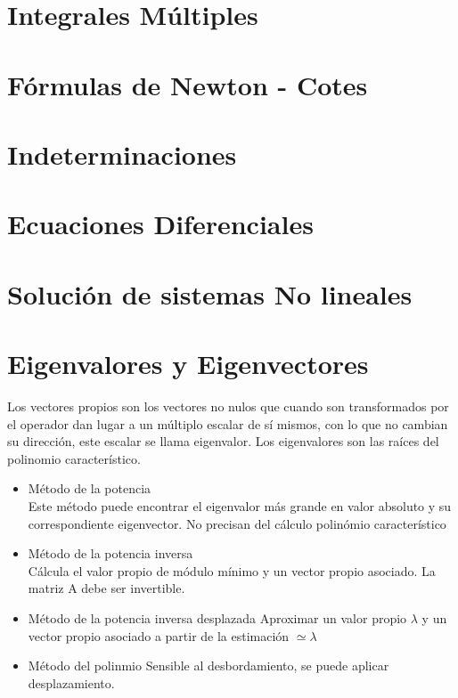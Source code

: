 \section{Integrales M\'ultiples}

\section{F\'ormulas de Newton - Cotes}

\section{Indeterminaciones}

\section{Ecuaciones Diferenciales}

\section{Soluci\'on de sistemas No lineales}

\section{Eigenvalores y Eigenvectores}
Los vectores propios son los vectores no nulos que cuando son transformados por el operador dan lugar a un m\'ultiplo escalar de s\'i mismos, con lo que no cambian su direcci\'on, este escalar se llama eigenvalor. Los eigenvalores son las ra\'ices del polinomio caracter\'istico.

\begin{itemize}
\item {M\'etodo de la potencia}\\
\noindent Este m\'etodo puede encontrar el eigenvalor m\'as grande en valor absoluto y su correspondiente eigenvector. No precisan del c\'alculo polin\'omio caracter\'istico

\item {M\'etodo de la potencia inversa}\\
\noindent C\'alcula el valor propio de m\'odulo m\'inimo y un vector propio asociado. La matriz A debe ser invertible.

\item {M\'etodo de la potencia inversa desplazada}
\noindent Aproximar un valor propio $\lambda$ y un vector propio asociado a partir de la estimaci\'on %
$\simeq \lambda$

\item {M\'etodo del polinmio}
\noindent Sensible al desbordamiento, se puede aplicar desplazamiento.
\end{itemize}

